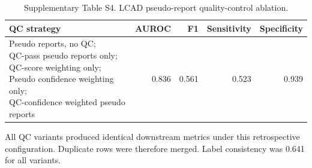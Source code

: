 \begin{table}[!htbp]
  \centering
  \caption{Supplementary Table S4. LCAD pseudo-report quality-control ablation.}
  \label{tab:s4_lcad_qc_ablation}
  \small
  \begin{threeparttable}
  \begin{tabular}{lrrrr}
    \toprule
    \textbf{QC strategy} & \textbf{AUROC} & \textbf{F1} & \textbf{Sensitivity} & \textbf{Specificity} \\
    \midrule
    \makecell[l]{Pseudo reports, no QC;\\QC-pass pseudo reports only;\\QC-score weighting only;\\Pseudo confidence weighting only;\\QC-confidence weighted pseudo reports} & 0.836 & 0.561 & 0.523 & 0.939 \\
    \bottomrule
  \end{tabular}
  \begin{tablenotes}[flushleft]
    \footnotesize
    \item All QC variants produced identical downstream metrics under this retrospective configuration. Duplicate rows were therefore merged. Label consistency was 0.641 for all variants.
  \end{tablenotes}
  \end{threeparttable}
\end{table}

